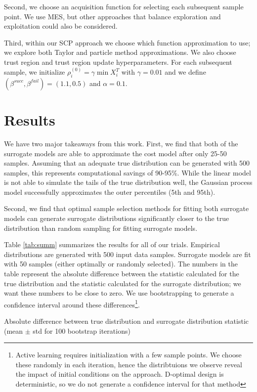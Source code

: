 \documentclass[10pt,twocolumn,letterpaper]{article}
\begin{document}
Second, we choose an acquisition function for selecting each subsequent sample point. We use MES, but other approaches that balance exploration and exploitation could also be considered. 

Third, within our SCP approach we choose which function approximation to use; we explore both Taylor and particle method approximations. We also choose trust region and trust region update hyperparameters. For each subsequent sample, we initialize $\rho^{(0)}_i = \gamma \min X_i^T$ with $\gamma=0.01$ and we define $(\beta^{succ}, \beta^{fail}) = (1.1, 0.5)$ and $\alpha=0.1$.

\section{Results}
\label{sec:results}
We have two major takeaways from this work. First, we find that both of the surrogate models are able to approximate the cost model after only 25-50 samples. Assuming that an adequate true distribution can be generated with 500 samples, this represents computational savings of 90-95\%. While the linear model is not able to simulate the tails of the true distribution well, the Gaussian process model successfully approximates the outer percentiles (5th and 95th).

Second, we find that optimal sample selection methods for fitting both surrogate models can generate surrogate distributions significantly closer to the true distribution than random sampling for fitting surrogate models.

Table \ref{tab:summ} summarizes the results for all of our trials. Empirical distributions are generated with 500 input data samples. Surrogate models are fit with 50 samples (either optimally or randomly selected). The numbers in the table represent the absolute difference between the statistic calculated for the true distribution and the statistic calculated for the surrogate distribution; we want these numbers to be close to zero. We use bootstrapping to generate a confidence interval around these differences\footnote{Active learning requires initialization with a few sample points. We choose these randomly in each iteration, hence the distribtuions we observe reveal the impact of initial conditions on the approach. D-optimal design is deterministic, so we do not generate a confidence interval for that method}.

\begin{table}[!htbp]
    \scriptsize
    \begin{center}
        \caption{\label{tab:summ} Absolute difference between true distribution and surrogate distribution statistic (mean $\pm$ std for 100 bootstrap iterations)}
        
    \end{center}
\end{table}
\end{document}
